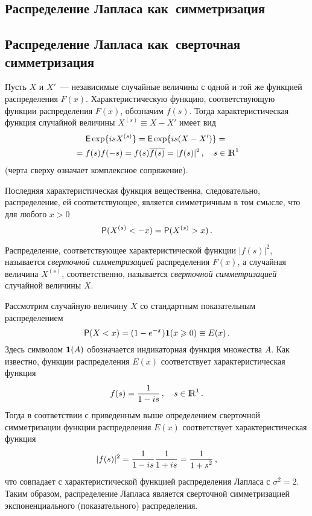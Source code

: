 \begin{multicols}{2}
\section{Распределение Лапласа как~симметризация}


\subsection{Распределение Лапласа как~сверточная симметризация}

Пусть $X$ и $X'$~--- независимые случайные величины с одной и той
же функцией распределения $F(x)$. Характеристическую функцию,
соответствующую функции распределения $F(x)$, обозначим $f(s)$.
Тогда характеристическая функция случайной величины $X^{(s)}\equiv
X-X'$ имеет вид
\begin{multline*}
{\sf E}\exp\{is X^{(s)}\}={\sf E}\exp\{is( X- X')\}={}\\
{}=f(s) f(-s)=f(s) \overline{f(s)}=|f(s)|^2\,, \quad
s\in{\rm I\hspace{-0.7mm}\rm R}^1
\end{multline*}
\noindent
(черта сверху означает комплексное сопряжение).
\pagebreak

Последняя характеристическая функция вещественна, следовательно,
распределение, ей соответствующее, является симметричным в том
смысле, что для любого $x>0$
$$
{\sf P}( X^{(s)}<-x)={\sf P}( X^{(s)}>x)\,.
$$


Распределение, соответствующее характеристической функции
$|f(s)|^2$, называется {\it сверточной симметризацией}
распределения $F(x)$, а случайная величина $ X^{(s)}$,
соответственно, называется {\it сверточной симметризацией}
случайной величины $X$.

Рассмотрим случайную величину $X$ со стандартным показательным
распределением
\begin{equation}
{\sf P}( X<x)=(1-e^{-x}){\bf 1}(x\geqslant0)\equiv E(x)\,.\label{2.1b}
\end{equation}
Здесь символом ${\bf 1}(A)$ обозначается
индикаторная функция множества $A$. Как известно, функции
распределения $E(x)$ соответствует характеристическая функция
$$
f(s)=\displaystyle\frac{\displaystyle 1\mathstrut}{\displaystyle 1-is\mathstrut}\,,\quad s\in{\rm I\hspace{-0.7mm}\rm R}^1\,.
$$
Тогда в соответствии с приведенным выше определением сверточной
симметризации функции распределения $E(x)$ соответствует
характеристическая функция
$$
|f(s)|^2=\displaystyle\frac{\displaystyle 1\mathstrut}{\displaystyle 1-is\mathstrut} \displaystyle\frac{\displaystyle 1\mathstrut}{\displaystyle 1+is\mathstrut}=\displaystyle\frac{\displaystyle 1\mathstrut}{\displaystyle 1+s^2\mathstrut}\,,
$$
что совпадает с характеристической функцией распределения Лапласа с
$\sigma^2=2$. Таким образом, распределение Лапласа является
сверточной симметризацией экспоненциального (показательного)
распределения.


\end{multicols}
